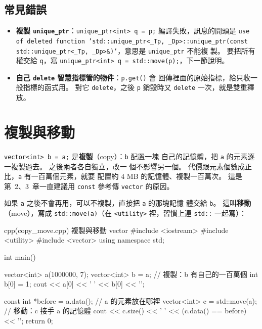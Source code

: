 \subsection{常見錯誤}

\begin{itemize}
\item \textbf{複製 \texttt{unique\_ptr}}：\texttt{unique\_ptr<int> q =
p;} 編譯失敗，訊息的開頭是 \texttt{use of deleted function
'std::unique\_ptr<\_Tp, \_Dp>::unique\_ptr(const
std::unique\_ptr<\_Tp, \_Dp>\&)'}，意思是 \texttt{unique\_ptr} 不能複
製。 要把所有權交給
\texttt{q}，寫 \texttt{unique\_ptr<int> q = std::move(p);}，下一節說明。
\item \textbf{自己 \texttt{delete} 智慧指標管的物件}：\texttt{p.get()} 會
回傳裡面的原始指標，給只收一般指標的函式用。 對它 \texttt{delete}，之後
\texttt{p} 銷毀時又 \texttt{delete} 一次，就是雙重釋放。
\end{itemize}

\section{複製與移動}
\label{sec:copy-move}

\texttt{vector<int> b = a;} 是\textbf{複製}（copy）：\texttt{b} 配置一塊
自己的記憶體，把 \texttt{a} 的元素逐一複製過去。 之後兩者各自獨立，改一
個不影響另一個。 代價跟元素個數成正比，\texttt{a} 有一百萬個元素，就要
配置約 $4$ MB 的記憶體、複製一百萬次。 這是第~2、3~章一直建議用
\texttt{const} 參考傳 \texttt{vector} 的原因。

如果 \texttt{a} 之後不會再用，可以不複製，直接把 \texttt{a} 的那塊記憶
體交給 \texttt{b}。 這叫\textbf{移動}（move），寫成
\texttt{std::move(a)}（在 \texttt{<utility>} 裡，習慣上連 \texttt{std::} 一起寫）：

\begin{example}[label=ex:copy-move]{cpp}{(copy\_move.cpp) 複製與移動 vector}
#include <iostream>
#include <utility>
#include <vector>
using namespace std;

int main() {
    vector<int> a(1000000, 7);
    vector<int> b = a;               // 複製：b 有自己的一百萬個 int
    b[0] = 1;
    cout << a[0] << ' ' << b[0] << '\n';

    const int *before = a.data();    // a 的元素放在哪裡
    vector<int> c = std::move(a);    // 移動：c 接手 a 的記憶體
    cout << c.size() << ' ' << (c.data() == before) << '\n';
    return 0;
}
\end{example}


